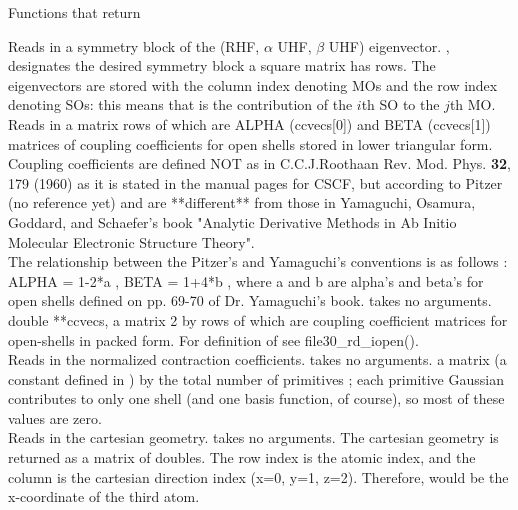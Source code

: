 \begin{center}
Functions that return 
\end{center}
{Reads in a symmetry block of 
the (RHF, $\alpha$ UHF, $\beta$ UHF) eigenvector.}
{, designates the desired symmetry block}
{a square matrix has 
rows.  The eigenvectors are stored with the column 
index denoting MOs and the row index denoting SOs: this means that 
 is the contribution of the $i$th SO to the $j$th MO.} \\
{Reads in a matrix rows of which are 
ALPHA (ccvecs[0]) and BETA (ccvecs[1]) matrices of coupling
coefficients for open shells stored in lower triangular form.
Coupling coefficients are defined NOT as in 
C.C.J.Roothaan Rev. Mod. Phys. {\bf 32}, 179 (1960) as it is stated in the
manual pages for CSCF, but according to Pitzer (no reference yet)
and are **different** from those in Yamaguchi, Osamura, Goddard, and
Schaefer's book "Analytic Derivative Methods in Ab Initio Molecular
Electronic Structure Theory".\\
The relationship between the Pitzer's and Yamaguchi's conventions is 
as follows : ALPHA = 1-2*a , BETA = 1+4*b , where a and b are 
alpha's and beta's for open shells 
defined on pp. 69-70 of Dr. Yamaguchi's book.
}
{takes no arguments.}
{double **ccvecs, a matrix 2 by  rows of which are coupling
coefficient matrices for open-shells in packed form.
For definition of  see file30\_rd\_iopen().} \\
{Reads in the normalized contraction coefficients.}
{takes no arguments.}
{a matrix  (a constant defined in )
by the total number of primitives ;
each primitive Gaussian contributes to only one shell (and one
basis function, of course), so most of these values are zero.} \\
{Reads in the cartesian geometry.}
{takes no arguments.}
{The cartesian geometry is returned as a matrix
of doubles.  The row index is the atomic index, and the column is the
cartesian direction index (x=0, y=1, z=2).  Therefore, 
would be the x-coordinate of the third atom.} \\
